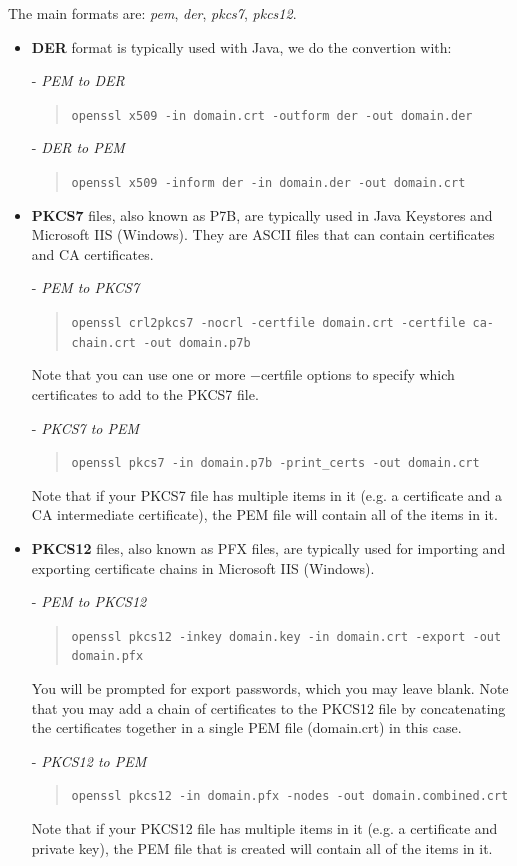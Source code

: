 \documentclass[11pt]{article}
\begin{document}
The main formats are: {\em pem}, {\em der}, {\em pkcs7}, {\em pkcs12}.
\begin{itemize}
 \item {\bf DER} format is typically used with Java, we do the convertion with:

 - {\em PEM to DER}
 \begin{quote}
 \texttt{openssl x509 -in domain.crt -outform der -out domain.der}
 \end{quote}

 - {\em DER to PEM}
 \begin{quote}
 \texttt{openssl x509 -inform der -in domain.der -out domain.crt}
 \end{quote}

 \item {\bf PKCS7} files, also known as P7B, are typically used in Java Keystores and Microsoft IIS (Windows). They are ASCII files that can contain certificates and CA certificates.

 - {\em PEM to PKCS7}
 \begin{quote}
 \texttt{openssl crl2pkcs7 -nocrl -certfile domain.crt -certfile ca-chain.crt -out domain.p7b}
 \end{quote}

 Note that you can use one or more $-$certfile options to specify which certificates to add to the PKCS7 file.

 - {\em PKCS7 to PEM}
 \begin{quote}
 \texttt{openssl pkcs7 -in domain.p7b -print\_certs -out domain.crt}
 \end{quote}

 Note that if your PKCS7 file has multiple items in it (e.g. a certificate and a CA intermediate certificate), the PEM file will contain all of the items in it.

\item {\bf PKCS12} files, also known as PFX files, are typically used for importing and exporting certificate chains in Microsoft IIS (Windows).

- {\em PEM to PKCS12}
 \begin{quote}
 \texttt{openssl pkcs12 -inkey domain.key -in domain.crt -export -out domain.pfx}
 \end{quote}

 You will be prompted for export passwords, which you may leave blank. Note that you may add a chain of certificates to the PKCS12 file by concatenating the certificates together in a single PEM file (domain.crt) in this case.

 - {\em PKCS12 to PEM}
 \begin{quote}
 \texttt{openssl pkcs12 -in domain.pfx -nodes -out domain.combined.crt}
 \end{quote}

 Note that if your PKCS12 file has multiple items in it (e.g. a certificate and private key), the PEM file that is created will contain all of the items in it.
\end{itemize}
\end{document}
